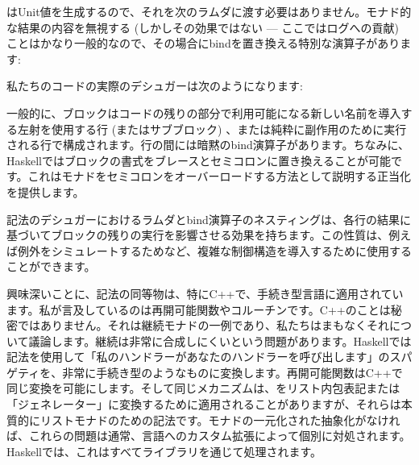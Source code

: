 はUnit値を生成するので、それを次のラムダに渡す必要はありません。モナド的な結果の内容を無視する (しかしその効果ではない --- ここではログへの貢献) ことはかなり一般的なので、その場合にbindを置き換える特別な演算子があります: 

私たちのコードの実際のデシュガーは次のようになります: 

一般的に、ブロックはコードの残りの部分で利用可能になる新しい名前を導入する左射を使用する行 (またはサブブロック) 、または純粋に副作用のために実行される行で構成されます。行の間には暗黙のbind演算子があります。ちなみに、Haskellではブロックの書式をブレースとセミコロンに置き換えることが可能です。これはモナドをセミコロンをオーバーロードする方法として説明する正当化を提供します。

記法のデシュガーにおけるラムダとbind演算子のネスティングは、各行の結果に基づいてブロックの残りの実行を影響させる効果を持ちます。この性質は、例えば例外をシミュレートするためなど、複雑な制御構造を導入するために使用することができます。

興味深いことに、記法の同等物は、特にC++で、手続き型言語に適用されています。私が言及しているのは再開可能関数やコルーチンです。C++のことは秘密ではありません。それは継続モナドの一例であり、私たちはまもなくそれについて議論します。継続は非常に合成しにくいという問題があります。Haskellでは記法を使用して「私のハンドラーがあなたのハンドラーを呼び出します」のスパゲティを、非常に手続き型のようなものに変換します。再開可能関数はC++で同じ変換を可能にします。そして同じメカニズムは、をリスト内包表記または「ジェネレーター」に変換するために適用されることがありますが、それらは本質的にリストモナドのための記法です。モナドの一元化された抽象化がなければ、これらの問題は通常、言語へのカスタム拡張によって個別に対処されます。Haskellでは、これはすべてライブラリを通じて処理されます。

